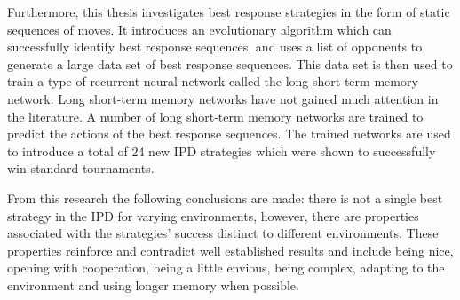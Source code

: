 Furthermore, this thesis investigates best response strategies in the form of
static sequences of moves. It introduces an evolutionary algorithm which can
successfully identify best response sequences, and uses a list of
\numberofstrategiesbestsequences opponents to generate a large data set of best
response sequences. This data set is then used to train a type of recurrent
neural network called the long short-term memory network. Long short-term memory
networks have not gained much attention in the literature. A number of long
short-term memory networks are trained to predict the actions of the best
response sequences. The trained networks are used to introduce a total of 24 new
IPD strategies which were shown to successfully win standard tournaments.

From this research the following conclusions are made: there is not a single
best strategy in the IPD for varying environments, however, there are properties
associated with the strategies' success distinct to different environments.
These properties reinforce and contradict well established results and include
being nice, opening with cooperation, being a little envious, being complex,
adapting to the environment and using longer memory when possible.
